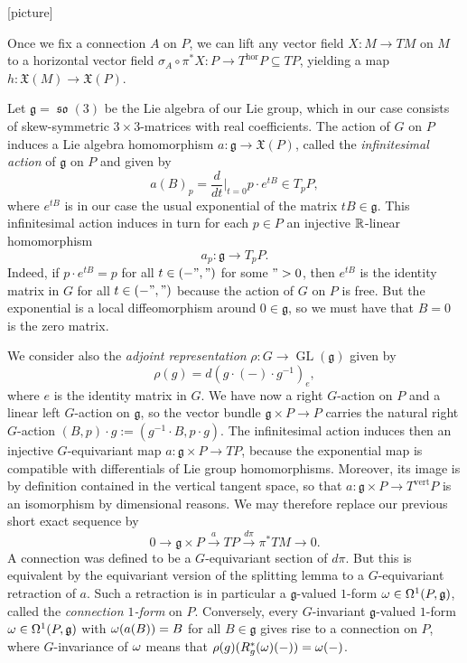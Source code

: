 \documentclass[A4paper, 12pt, british, reqno]{amsart}
\DeclareMathOperator{\GL}{GL}
\DeclareMathOperator{\so}{\mathfrak{so}}
\renewcommand{\X}{\mathfrak{X}}
\newcommand{\g}{\mathfrak{g}}
\begin{document}
[picture]

\begin{rem}
    Once we fix a connection $A$ on $P$, we can lift any vector field $X\colon M\to TM$ on $M$ to a horizontal vector field $\sigma_{A}\circ \pi^{*}X\colon P\to T^{\mathrm{hor}}P\subseteq TP$, yielding a map $h\colon \X(M)\to \X(P)$.
\end{rem}

Let $\g=\so(3)$ be the Lie algebra of our Lie group, which in our case consists of skew-symmetric $3\times 3$-matrices with real coefficients.
The action of $G$ on $P$ induces a Lie algebra homomorphism $a\colon \g\to\X(P)$, called the \textit{infinitesimal action} of $\g$ on $P$ and given by
\[ a(B)_{p}=\frac{d}{dt}\big\rvert_{t=0}p\cdot e^{tB}\in T_{p}P, \]
where $e^{tB}$ is in our case the usual exponential of the matrix $tB\in \g$.
This infinitesimal action induces in turn for each $p\in P$ an injective $\mathbb{R}$-linear homomorphism
\[ a_{p}\colon \g\to T_{p}P. \]
Indeed, if $p\cdot e^{tB}=p$ for all $t\in (-",")$ for some $">0$, then $e^{tB}$ is the identity matrix in $G$ for all $t\in (-",")$ because the action of $G$ on $P$ is free.
But the exponential is a local diffeomorphism around $0\in \g$, so we must have that $B=0$ is the zero matrix.

We consider also the \textit{adjoint representation} $\rho\colon G\to \GL(\g)$ given by
\[ \rho(g)=d(g\cdot (-)\cdot g^{-1})_{e}, \]
where $e$ is the identity matrix in $G$.
We have now a right $G$-action on $P$ and a linear left $G$-action on $\g$, so the vector bundle $\g\times P\to P$ carries the natural right $G$-action $(B,p)\cdot g:=(g^{-1}\cdot B, p\cdot g)$.
The infinitesimal action induces then an injective $G$-equivariant map $a\colon \g\times P\to TP$, because the exponential map is compatible with differentials of Lie group homomorphisms.
Moreover, its image is by definition contained in the vertical tangent space, so that $a\colon \g\times P\to T^{\mathrm{vert}}P$ is an isomorphism by dimensional reasons.
We may therefore replace our previous short exact sequence by
\[ 0\to \g\times P\xrightarrow{a} TP\xrightarrow{d\pi} \pi^{*}TM\to 0. \]
A connection was defined to be a $G$-equivariant section of $d\pi$.
But this is equivalent by the equivariant version of the splitting lemma to a $G$-equivariant retraction of $a$.
Such a retraction is in particular a $\g$-valued $1$-form $\w\in \Omega^{1}(P,\g)$, called the \textit{connection $1$-form} on $P$.
Conversely, every $G$-invariant $\g$-valued $1$-form $\w\in \Omega^{1}(P,\g)$ with $\omega(a(B))=B$ for all $B\in \g$ gives rise to a connection on $P$, where $G$-invariance of $\omega$ means that $\rho(g)(R_{g}^{*}(\omega)(-))=\omega(-)$.
\end{document}
